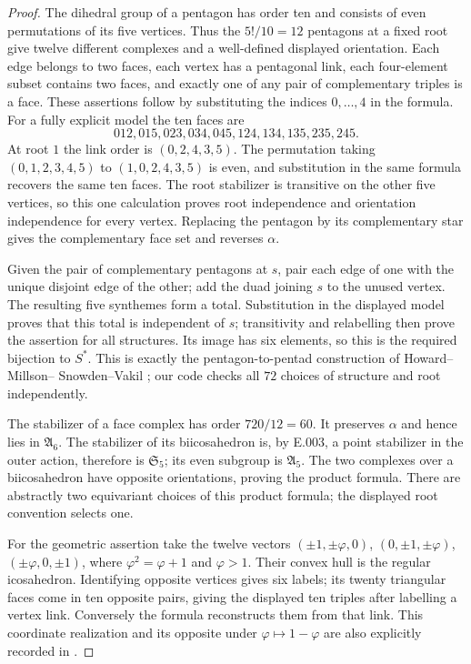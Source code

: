 \begin{proof}
The dihedral group of a pentagon has order ten and consists of even
permutations of its five vertices. Thus the $5!/10=12$ pentagons at a
fixed root give twelve different complexes and a well-defined displayed
orientation. Each edge belongs to two faces, each vertex has a pentagonal
link, each four-element subset contains two faces, and exactly one of
any pair of complementary triples is a face. These assertions follow
by substituting the indices $0,\ldots,4$ in the formula. For a fully
explicit model the ten faces are
\[
012,015,023,034,045,124,134,135,235,245.
\]
At root $1$ the link order is $(0,2,4,3,5)$. The permutation taking
$(0,1,2,3,4,5)$ to $(1,0,2,4,3,5)$ is even, and substitution in the
same formula recovers the same ten faces. The root stabilizer is
transitive on the other five vertices, so this one calculation proves
root independence and orientation independence for every vertex.
Replacing the pentagon by its complementary star gives the complementary
face set and reverses $\alpha$.

Given the pair of complementary pentagons at $s$, pair each edge of one
with the unique disjoint edge of the other; add the duad joining $s$ to
the unused vertex. The resulting five synthemes form a total. Substitution
in the displayed model proves that this total is independent of $s$;
transitivity and relabelling then prove the assertion for all structures.
Its image has six elements, so this is the required bijection to $S^*$.
This is exactly the pentagon-to-pentad construction of Howard--Millson--
Snowden--Vakil \cite[\S\S1.2--1.4, pp.2--3]{HMSV2008}; our code checks
all $72$ choices of structure and root independently.

The stabilizer of a face complex has order $720/12=60$. It preserves
$\alpha$ and hence lies in $\mathfrak A_6$. The stabilizer of its
biicosahedron is, by E.003, a point stabilizer in the outer action,
therefore is $\mathfrak S_5$; its even subgroup is $\mathfrak A_5$.
The two complexes over a biicosahedron have opposite orientations, proving
the product formula. There are abstractly two equivariant choices of
this product formula; the displayed root convention selects one.

For the geometric assertion take the twelve vectors
$(\pm1,\pm\varphi,0)$, $(0,\pm1,\pm\varphi)$,
$(\pm\varphi,0,\pm1)$, where $\varphi^2=\varphi+1$ and $\varphi>1$.
Their convex hull is the regular icosahedron. Identifying opposite
vertices gives six labels; its twenty triangular faces come in ten
opposite pairs, giving the displayed ten triples after labelling a
vertex link. Conversely the formula reconstructs them from that link.
This coordinate realization and its opposite under
$\varphi\mapsto1-\varphi$ are also explicitly recorded in
\cite[\S1.3, p.2]{HMSV2008}.
\end{proof}

